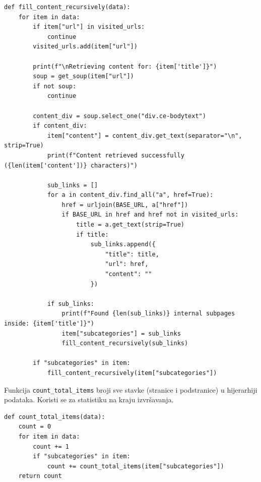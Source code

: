 \documentclass[]{foi}
\begin{document}
\begin{longlisting}
\begin{verbatim}
def fill_content_recursively(data):
    for item in data:
        if item["url"] in visited_urls:
            continue
        visited_urls.add(item["url"])

        print(f"\nRetrieving content for: {item['title']}")
        soup = get_soup(item["url"])
        if not soup:
            continue

        content_div = soup.select_one("div.ce-bodytext")
        if content_div:
            item["content"] = content_div.get_text(separator="\n", strip=True)
            print(f"Content retrieved successfully ({len(item['content'])} characters)")

            sub_links = []
            for a in content_div.find_all("a", href=True):
                href = urljoin(BASE_URL, a["href"])
                if BASE_URL in href and href not in visited_urls:
                    title = a.get_text(strip=True)
                    if title:
                        sub_links.append({
                            "title": title,
                            "url": href,
                            "content": ""
                        })

            if sub_links:
                print(f"Found {len(sub_links)} internal subpages inside: {item['title']}")
                item["subcategories"] = sub_links
                fill_content_recursively(sub_links)

        if "subcategories" in item:
            fill_content_recursively(item["subcategories"])
\end{verbatim}
\caption{Scraper 3/6}
\label{lst:scraper3}
\end{longlisting}

Funkcija \verb|count_total_items| broji sve stavke (stranice i podstranice) u hijerarhiji podataka. Koristi se za statistiku na kraju izvršavanja.  

\begin{longlisting}
\begin{verbatim}
def count_total_items(data):
    count = 0
    for item in data:
        count += 1
        if "subcategories" in item:
            count += count_total_items(item["subcategories"])
    return count
\end{verbatim}
\caption{Scraper 4/6}
\label{lst:scraper4}
\end{longlisting}
\end{document}
